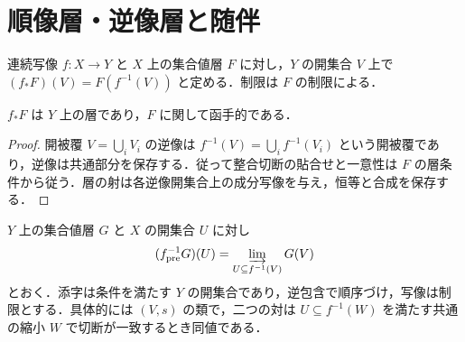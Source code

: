 \section{順像層・逆像層と随伴}
\begin{defn}[順像層]
連続写像 $f:X\to Y$ と $X$ 上の集合値層 $F$ に対し，$Y$ の開集合 $V$ 上で $(f_*F)(V)=F(f^{-1}(V))$ と定める．制限は $F$ の制限による．
\end{defn}
\begin{prop}[順像の層性]
$f_*F$ は $Y$ 上の層であり，$F$ に関して函手的である．
\end{prop}
\begin{proof}
開被覆 $V=\bigcup_iV_i$ の逆像は $f^{-1}(V)=\bigcup_i f^{-1}(V_i)$ という開被覆であり，逆像は共通部分を保存する．従って整合切断の貼合せと一意性は $F$ の層条件から従う．層の射は各逆像開集合上の成分写像を与え，恒等と合成を保存する．
\end{proof}
\begin{defn}[逆像前層]
$Y$ 上の集合値層 $G$ と $X$ の開集合 $U$ に対し
\[
(f^{-1}_{\mathrm{pre}}G)(U)=\varinjlim_{U\subseteq f^{-1}(V)}G(V)
\]
とおく．添字は条件を満たす $Y$ の開集合であり，逆包含で順序づけ，写像は制限とする．具体的には $(V,s)$ の類で，二つの対は $U\subseteq f^{-1}(W)$ を満たす共通の縮小 $W$ で切断が一致するとき同値である．
\end{defn}
